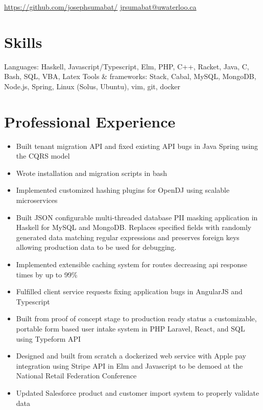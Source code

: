 \documentclass{simple_resume}
\begin{document}
{}
{\href{https://github.com/josephsumabat/}{https://github.com/josephsumabat/}}
{\href{to:jrsumabat@uwaterloo.ca}{jrsumabat@uwaterloo.ca}}

\section{Skills}
\resskillheading
    {Languages:}
    {Haskell, Javascript/Typescript, Elm, PHP, C++, Racket, Java, C, Bash, SQL, VBA, Latex}
    \resskillheading
    {Tools \& frameworks:}
    {Stack, Cabal, MySQL, MongoDB, Node.js, Spring, Linux (Solus, Ubuntu), vim, git, docker}

\section{Professional Experience}
\begin{itemize}
  \item Built tenant migration API and fixed existing API bugs in Java Spring using the CQRS model
  \item Wrote installation and migration scripts in bash
  \item Implemented customized hashing plugins for OpenDJ using scalable microservices
\end{itemize}

\begin{itemize}
  \item{Built JSON configurable multi-threaded database PII masking
      application in Haskell for MySQL and MongoDB. Replaces specified fields
      with randomly generated data matching regular expressions and preserves
    foreign keys allowing production data to be used for debugging.}
  \item{Implemented extensible caching system for routes decreasing api response times by up to 99\%}
  \item{Fulfilled client service requests fixing application bugs in AngularJS and Typescript}
\end{itemize}

\begin{itemize}
  \item{Built from proof of concept stage to production ready status a customizable, portable form based user intake system in PHP Laravel, React, and SQL using Typeform API}
  \item{Designed and built from scratch a dockerized web service with Apple pay integration using Stripe API in Elm and Javascript to be demoed at the National Retail Federation Conference}
  \item{Updated Salesforce product and customer import system to properly validate data}
\end{itemize}
\end{document}
